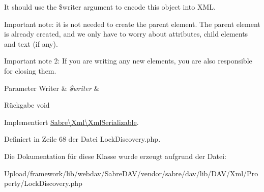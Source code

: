 It should use the \$writer argument to encode this object into X\+ML.

Important note\+: it is not needed to create the parent element. The parent element is already created, and we only have to worry about attributes, child elements and text (if any).

Important note 2\+: If you are writing any new elements, you are also responsible for closing them.


\begin{DoxyParams}[1]{Parameter}
Writer & {\em \$writer} & \\
\hline
\end{DoxyParams}
\begin{DoxyReturn}{Rückgabe}
void 
\end{DoxyReturn}


Implementiert \mbox{\hyperlink{interface_sabre_1_1_xml_1_1_xml_serializable_aa78f3ee43aa699be8347181653a53d8c}{Sabre\textbackslash{}\+Xml\textbackslash{}\+Xml\+Serializable}}.



Definiert in Zeile 68 der Datei Lock\+Discovery.\+php.



Die Dokumentation für diese Klasse wurde erzeugt aufgrund der Datei\+:\begin{DoxyCompactItemize}
\item 
Upload/framework/lib/webdav/\+Sabre\+D\+A\+V/vendor/sabre/dav/lib/\+D\+A\+V/\+Xml/\+Property/Lock\+Discovery.\+php\end{DoxyCompactItemize}
